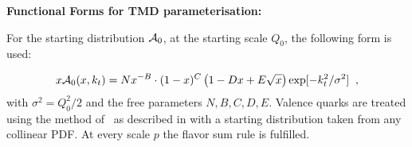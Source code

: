 \begin{description}
\vspace{0.1cm}
\item \bf {Functional Forms for TMD parameterisation:} \rm

For the starting distribution ${\cal A}_0$, at the starting scale $Q_0$, 
the following form is used:

{\small{ 
\begin{eqnarray}
x{\cal A}_0(x,\kt) = N x^{-B} \cdot (1 -x)^{C}\left( 1 -D x 
+ E \sqrt{x}   \right) 
   \exp[ - k_t^2 / \sigma^2 ]  \;\; , 
\label{a0-5par}
\end{eqnarray}
       }}
with $ \sigma^2  =  Q_0^2 / 2 $ and the free parameters $N,B,C,D, E$.
Valence quarks are treated  using the method of~\cite{Deak:2010gk} as described 
in \cite{Hautmann:2013tba} with a starting distribution taken from any collinear PDF.
At every scale $p$  the flavor sum rule is fulfilled. 
\end{description}




